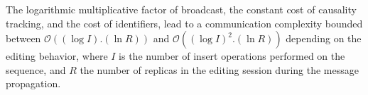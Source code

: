 
The logarithmic multiplicative factor of broadcast, the constant cost of
causality tracking, and the cost of identifiers, lead to a communication
complexity bounded between $\mathcal{O}((\log I).(\ln R))$ and
$\mathcal{O}((\log I)^2.(\ln R))$ depending on the editing behavior, where $I$
is the number of insert operations performed on the sequence, and $R$ the number
of replicas in the editing session during the message propagation.







